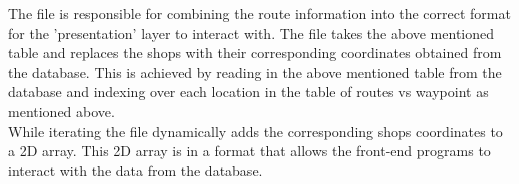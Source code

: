\documentclass[10pt, a4paper, twocolumn]{scrartcl}
\begin{document}
				The file is responsible for combining the route information into the correct format for the 'presentation' layer to interact with. The file takes the above mentioned table and replaces the shops with their corresponding coordinates obtained from the database. This is achieved by reading in the above mentioned table from the database and indexing over each location in the table of routes vs waypoint as mentioned above. \\
				
				While iterating the file dynamically adds the corresponding shops coordinates to a 2D array. This 2D array is in a format that allows the front-end programs to interact with the data from the database. 
	
\end{document}
